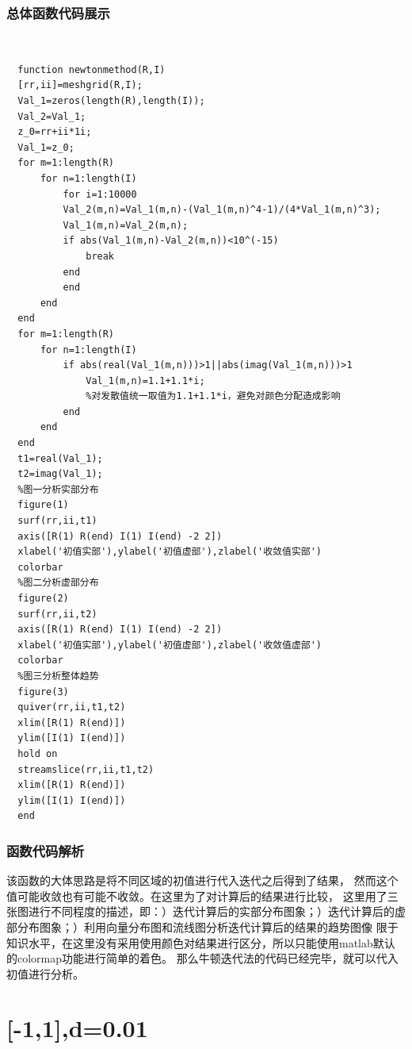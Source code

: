 \documentclass[UTF8,a4paper,10pt]{ctexart}
\begin{document}
\subsubsection{总体函数代码展示}
~\\
\lstset{language=matlab}
\begin{lstlisting}
  function newtonmethod(R,I)
  [rr,ii]=meshgrid(R,I);
  Val_1=zeros(length(R),length(I));
  Val_2=Val_1;
  z_0=rr+ii*1i;
  Val_1=z_0;
  for m=1:length(R)
      for n=1:length(I)
          for i=1:10000
          Val_2(m,n)=Val_1(m,n)-(Val_1(m,n)^4-1)/(4*Val_1(m,n)^3);
          Val_1(m,n)=Val_2(m,n);
          if abs(Val_1(m,n)-Val_2(m,n))<10^(-15)
              break
          end
          end
      end
  end
  for m=1:length(R)
      for n=1:length(I)
          if abs(real(Val_1(m,n)))>1||abs(imag(Val_1(m,n)))>1
              Val_1(m,n)=1.1+1.1*i;
              %对发散值统一取值为1.1+1.1*i，避免对颜色分配造成影响
          end
      end
  end
  t1=real(Val_1);
  t2=imag(Val_1);
  %图一分析实部分布
  figure(1)
  surf(rr,ii,t1)
  axis([R(1) R(end) I(1) I(end) -2 2])
  xlabel('初值实部'),ylabel('初值虚部'),zlabel('收敛值实部')
  colorbar
  %图二分析虚部分布
  figure(2)
  surf(rr,ii,t2)
  axis([R(1) R(end) I(1) I(end) -2 2])
  xlabel('初值实部'),ylabel('初值虚部'),zlabel('收敛值虚部')
  colorbar
  %图三分析整体趋势
  figure(3)
  quiver(rr,ii,t1,t2)
  xlim([R(1) R(end)])
  ylim([I(1) I(end)])
  hold on
  streamslice(rr,ii,t1,t2)
  xlim([R(1) R(end)])
  ylim([I(1) I(end)])
  end
\end{lstlisting}

\subsubsection{函数代码解析}
该函数的大体思路是将不同区域的初值进行代入迭代之后得到了结果，
然而这个值可能收敛也有可能不收敛。在这里为了对计算后的结果进行比较，
这里用了三张图进行不同程度的描述，即：）迭代计算后的实部分布图象；）迭代计算后的虚部分布图象；）利用向量分布图和流线图分析迭代计算后的结果的趋势图像\newline
限于知识水平，在这里没有采用使用颜色对结果进行区分，所以只能使用matlab默认
的colormap功能进行简单的着色。\newline
那么牛顿迭代法的代码已经完毕，就可以代入初值进行分析。

\section{[-1,1]\times [-1,1],d=0.01}
\end{document}
